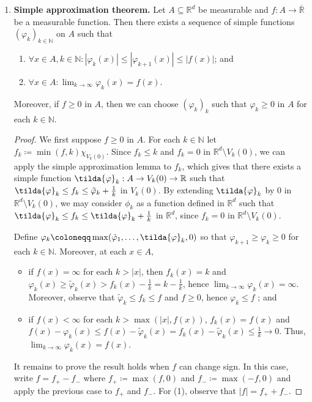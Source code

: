 \begin{enumerate}
\begin{proof}
	\end{proof}
\item \textbf{Simple approximation theorem.} Let \( A \subseteq \mathbb{R}^{d}  \) be measurable and \( f : A \to \overline{\mathbb{R}} \) be a measurable function. Then there exists a sequence of simple functions \( (\varphi _k)_{k \in \mathbb{N} }  \) on \( A \) such that
\begin{enumerate}
	\item \(\forall x \in A, k \in \mathbb{N} : |\varphi _k(x)| \leq |\varphi _{k+1}(x) | \leq |f(x)| \); and
	\item \(\forall x \in A : \lim_{{k} \to {\infty}} \varphi _k(x) = f(x) \).
\end{enumerate}
Moreover, if \( f \geq 0 \) in \( A \), then we can choose \(( \varphi _k )_k\) such that \( \varphi _k \geq 0 \) in \( A \) for each \( k \in \mathbb{N}  \).
\begin{proof}\renewcommand{\qedsymbol}{}
We first suppose \( f \geq 0 \) in \( A \). For each \( k \in \mathbb{N}  \) let \( f_k\coloneqq \min (f,k)\chi_{V_{k} (0)}  \). Since \( f_k \leq k  \) and \( f_k = 0 \) in \( \mathbb{R}^{d} \setminus V_k(0) \), we can apply the simple approximation lemma to \( f_k \), which gives that there exists a simple function \( \tilda{\varphi}_k : A \to V_k(0) \to \mathbb{R} \) such that \( \tilda{\varphi}_k \leq f_k \leq \tilde{\varphi}_k + \frac{1}{k}  \) in \( V_k(0). \) By extending \( \tilda{\varphi}_k \) by 0 in \( \mathbb{R}^{d} \setminus V_k(0) \), we may consider \( \phi_k \) as a function defined in \( \mathbb{R}^{d}  \) such that \( \tilda{\varphi}_k \leq f_k \leq \tilda{\varphi}_k + \frac{1}{k}  \) in \( \mathbb{R}^{d}  \), since \( f_k = 0 \) in \( \mathbb{R}^{d} \setminus V_k(0) \).

Define \( \varphi _k \coloneqq \max (\tilde{\varphi}_1, \hdots , \tilda{\varphi}_k , 0) \) so that \( \varphi_{k+1} \geq \varphi _k \geq 0   \) for each \( k \in \mathbb{N}  \). Moreover, at each \(x \in A,\)
\begin{itemize}
	\item if \( f(x) = \infty \) for each \( k > |x| \), then \( f_k(x) = k \) and \( \varphi _k (x) \geq \tilde{\varphi }_k(x) > f_k(x) - \frac{1}{k} = k - \frac{1}{k}  \), hence \( \lim_{{k} \to {\infty}} \varphi _k (x) = \infty \). Moreover, observe that \( \tilde{\varphi }_k \leq f _k \leq f \) and \( f \geq 0 \), hence \( \varphi _k \leq f \)  ; and
	\item if \( f(x) < \infty \) for each \( k > \max (|x|, f(x)) \), \( f_k(x) = f(x) \) and \( f(x) - \varphi _k(x) \leq f(x) - \tilde{\varphi }_k(x) = f_k(x) - \tilde{\varphi}_k(x) \leq \frac{1}{k} \to 0  \). Thus, \( \lim_{{k} \to {\infty}} \varphi _k (x) = f(x) \).
\end{itemize}
It remains to prove the result holds when \( f \) can change sign. In this case, write \( f = f_+ - f_- \) where \( f_+ \coloneqq \max (f , 0) \) and \( f_- \coloneqq  \max(-f,0) \) and apply the previous case to \( f_+ \) and \( f_- \). For (1), observe that \( |f| = f_+ + f_- \).
\end{proof}
\end{enumerate}

